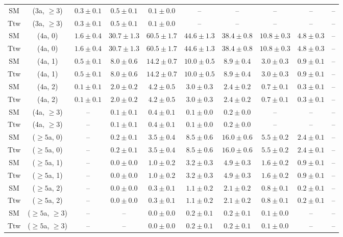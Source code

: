 \begin{table}[h!]
{\begin{tabular}{cccccccccc}
	SM & (3a, $\ge3$) & $0.3\pm 0.1$ & $0.5\pm 0.1$ & $0.1\pm 0.0$ & -- & -- & -- & -- & -- \\[0.5ex] 
	Ttw & (3a, $\ge3$) & $0.3\pm 0.1$ & $0.5\pm 0.1$ & $0.1\pm 0.0$ & -- & -- & -- & -- & -- \\[0.5ex] 
	SM & (4a, 0) & $1.6\pm 0.4$ & $30.7\pm 1.3$ & $60.5\pm 1.7$ & $44.6\pm 1.3$ & $38.4\pm 0.8$ & $10.8\pm 0.3$ & $4.8\pm 0.3$ & -- \\[0.5ex] 
	Ttw & (4a, 0) & $1.6\pm 0.4$ & $30.7\pm 1.3$ & $60.5\pm 1.7$ & $44.6\pm 1.3$ & $38.4\pm 0.8$ & $10.8\pm 0.3$ & $4.8\pm 0.3$ & -- \\[0.5ex] 
	SM & (4a, 1) & $0.5\pm 0.1$ & $8.0\pm 0.6$ & $14.2\pm 0.7$ & $10.0\pm 0.5$ & $8.9\pm 0.4$ & $3.0\pm 0.3$ & $0.9\pm 0.1$ & -- \\[0.5ex] 
	Ttw & (4a, 1) & $0.5\pm 0.1$ & $8.0\pm 0.6$ & $14.2\pm 0.7$ & $10.0\pm 0.5$ & $8.9\pm 0.4$ & $3.0\pm 0.3$ & $0.9\pm 0.1$ & -- \\[0.5ex] 
	SM & (4a, 2) & $0.1\pm 0.1$ & $2.0\pm 0.2$ & $4.2\pm 0.5$ & $3.0\pm 0.3$ & $2.4\pm 0.2$ & $0.7\pm 0.1$ & $0.3\pm 0.1$ & -- \\[0.5ex] 
	Ttw & (4a, 2) & $0.1\pm 0.1$ & $2.0\pm 0.2$ & $4.2\pm 0.5$ & $3.0\pm 0.3$ & $2.4\pm 0.2$ & $0.7\pm 0.1$ & $0.3\pm 0.1$ & -- \\[0.5ex] 
	SM & (4a, $\ge3$) & -- & $0.1\pm 0.1$ & $0.4\pm 0.1$ & $0.1\pm 0.0$ & $0.2\pm 0.0$ & -- & -- & -- \\[0.5ex] 
	Ttw & (4a, $\ge3$) & -- & $0.1\pm 0.1$ & $0.4\pm 0.1$ & $0.1\pm 0.0$ & $0.2\pm 0.0$ & -- & -- & -- \\[0.5ex] 
	SM & ($\ge5$a, 0) & -- & $0.2\pm 0.1$ & $3.5\pm 0.4$ & $8.5\pm 0.6$ & $16.0\pm 0.6$ & $5.5\pm 0.2$ & $2.4\pm 0.1$ & -- \\[0.5ex] 
	Ttw & ($\ge5$a, 0) & -- & $0.2\pm 0.1$ & $3.5\pm 0.4$ & $8.5\pm 0.6$ & $16.0\pm 0.6$ & $5.5\pm 0.2$ & $2.4\pm 0.1$ & -- \\[0.5ex] 
	SM & ($\ge5$a, 1) & -- & $0.0\pm 0.0$ & $1.0\pm 0.2$ & $3.2\pm 0.3$ & $4.9\pm 0.3$ & $1.6\pm 0.2$ & $0.9\pm 0.1$ & -- \\[0.5ex] 
	Ttw & ($\ge5$a, 1) & -- & $0.0\pm 0.0$ & $1.0\pm 0.2$ & $3.2\pm 0.3$ & $4.9\pm 0.3$ & $1.6\pm 0.2$ & $0.9\pm 0.1$ & -- \\[0.5ex] 
	SM & ($\ge5$a, 2) & -- & $0.0\pm 0.0$ & $0.3\pm 0.1$ & $1.1\pm 0.2$ & $2.1\pm 0.2$ & $0.8\pm 0.1$ & $0.2\pm 0.1$ & -- \\[0.5ex] 
	Ttw & ($\ge5$a, 2) & -- & $0.0\pm 0.0$ & $0.3\pm 0.1$ & $1.1\pm 0.2$ & $2.1\pm 0.2$ & $0.8\pm 0.1$ & $0.2\pm 0.1$ & -- \\[0.5ex] 
	SM & ($\ge5$a, $\ge3$) & -- & -- & $0.0\pm 0.0$ & $0.2\pm 0.1$ & $0.2\pm 0.1$ & $0.1\pm 0.0$ & -- & -- \\[0.5ex] 
	Ttw & ($\ge5$a, $\ge3$) & -- & -- & $0.0\pm 0.0$ & $0.2\pm 0.1$ & $0.2\pm 0.1$ & $0.1\pm 0.0$ & -- & -- \\[0.5ex] 
	\hline
	\hline
\end{tabular}}
\end{table}
